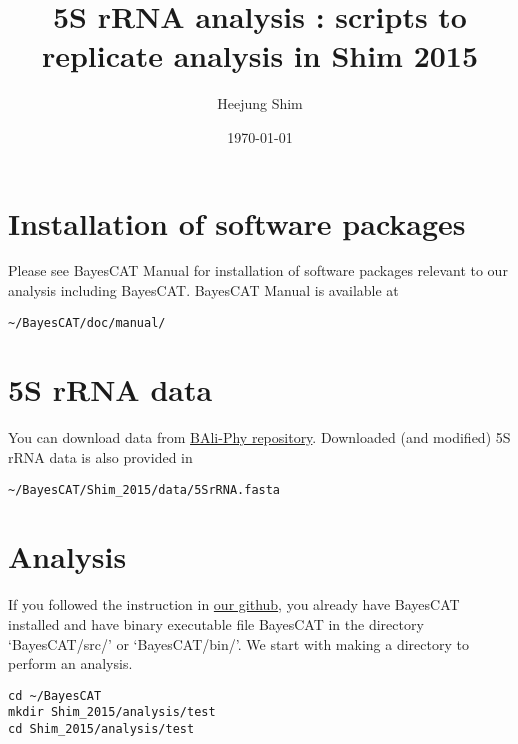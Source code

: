 \documentclass[11pt]{article}
\author{Heejung Shim}
\date{\today}
\title{5S rRNA analysis : scripts to replicate analysis in Shim 2015}
\begin{document}
\maketitle
\tableofcontents


\section{Installation of software packages}
\label{sec-1}
Please see BayesCAT Manual for installation of software packages relevant to our analysis including BayesCAT. BayesCAT Manual is available at 
\begin{lstlisting}
~/BayesCAT/doc/manual/
\end{lstlisting}

\section{5S rRNA data}
\label{sec-2}
You can download data from \href{https://github.com/bredelings/BAli-Phy/blob/master/examples/Sequences/5S-rRNA/5d.fasta}{BAli-Phy repository}. Downloaded (and modified) 5S rRNA data is also provided in 
\begin{lstlisting}
~/BayesCAT/Shim_2015/data/5SrRNA.fasta
\end{lstlisting}

\section{Analysis}
\label{sec-3}
If you followed the instruction in \href{https://github.com/heejungshim/BayesCAT}{our github}, you already have BayesCAT installed and have binary executable file BayesCAT in the directory `BayesCAT/src/' or `BayesCAT/bin/'. We start with making a directory to perform an analysis.
\begin{lstlisting}
cd ~/BayesCAT
mkdir Shim_2015/analysis/test
cd Shim_2015/analysis/test
\end{lstlisting}
\end{document}
